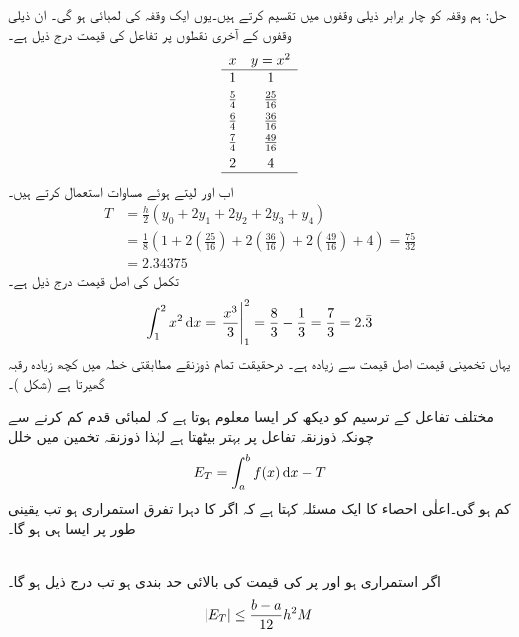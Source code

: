 حل:\quad
ہم وقفہ  کو چار برابر ذیلی وقفوں میں تقسیم کرتے ہیں۔یوں ایک وقفہ کی لمبائی  ہو گی۔ ان ذیلی وقفوں کے آخری نقطوں پر تفاعل  کی قیمت  درج ذیل ہے۔
\begin{align*}
\begin{array}{cc}
x&y=x^2\\
\hline
1&1\\[0.75ex]
\frac{5}{4}&\frac{25}{16}\\[0.75ex]
\frac{6}{4}&\frac{36}{16}\\[0.75ex]
\frac{7}{4}&\frac{49}{16}\\[0.75ex]
2&4\\
\hline
\end{array}
\end{align*}
 اب  اور  لیتے ہوئے مساوات  استعمال کرتے ہیں۔
\begin{align*}
T&=\frac{h}{2}(y_0+2y_1+2y_2+2y_3+y_4)\\
&=\frac{1}{8}(1+2(\tfrac{25}{16})+2(\tfrac{36}{16})+2(\tfrac{49}{16})+4)=\frac{75}{32}\\
&=\num{2.34375}
\end{align*} 
تکمل کی اصل قیمت درج ذیل ہے۔
\begin{align*}
\int_1^2x^2\dif x=\left.\frac{x^3}{3}\right\vert_1^2=\frac{8}{3}-\frac{1}{3}=\frac{7}{3}=2.\bar{3}
\end{align*}
یہاں تخمینی قیمت اصل قیمت سے زیادہ ہے۔ درحقیقت تمام ذوزنقے مطابقتی خطہ میں کچھ زیادہ رقبہ گھیرتا ہے (شکل )۔

مختلف تفاعل کے ترسیم کو دیکھ کر ایسا معلوم ہوتا ہے  کہ لمبائی قدم  کم کرنے سے چونکہ ذوزنقہ تفاعل پر بہتر بیٹھتا ہے لہٰذا ذوزنقہ تخمین میں خلل
\begin{align}\label{مساوات_تکمل_خلل_ذوزنقہ_تعریف}
E_T=\int_a^bf(x)\dif x-T
\end{align}
 کم ہو گی۔اعلٰی احصاء کا ایک مسئلہ کہتا ہے کہ اگر  کا دہرا تفرق استمراری ہو تب یقینی طور پر ایسا ہی ہو گا۔

\\
اگر  استمراری ہو اور  پر  کی قیمت کی بالائی حد بندی   ہو تب درج ذیل ہو گا۔
\begin{align}\label{مساوات_تکمل_ذوزنقہ_قاعدہ_خلل_مطلق}
\abs{E_T}\le \frac{b-a}{12}h^2M
\end{align} 

